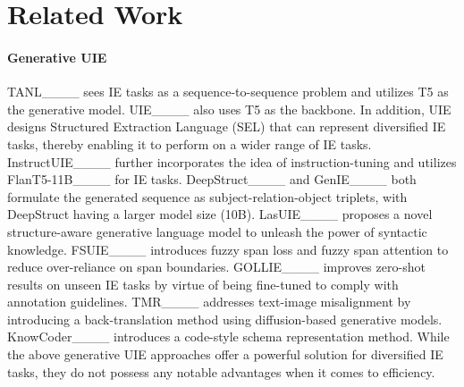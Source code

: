 \section{Related Work}
\label{related-work}

\paragraph{Generative UIE} TANL____ sees IE tasks as a sequence-to-sequence problem and utilizes T5 as the generative model. UIE____ also uses T5 as the backbone. In addition, UIE designs Structured Extraction Language (SEL) that can represent diversified IE tasks, thereby enabling it to perform on a wider range of IE tasks.
InstructUIE____ further incorporates the idea of instruction-tuning and utilizes FlanT5-11B____ for IE tasks. DeepStruct____ and GenIE____ both formulate the generated sequence as subject-relation-object triplets, with DeepStruct having a larger model size (10B). LasUIE____ proposes a novel structure-aware generative language model to unleash the power of syntactic knowledge. FSUIE____ introduces fuzzy span loss and fuzzy span attention to reduce over-reliance on span boundaries. 
GOLLIE____ improves zero-shot results on unseen IE tasks by virtue of being fine-tuned to comply with annotation
guidelines.
TMR____ addresses text-image misalignment by introducing a back-translation method using diffusion-based generative models. KnowCoder____  introduces a
code-style schema representation method. While the above generative UIE approaches offer a powerful solution for diversified IE tasks, they do not possess any notable advantages when it comes to efficiency. 
